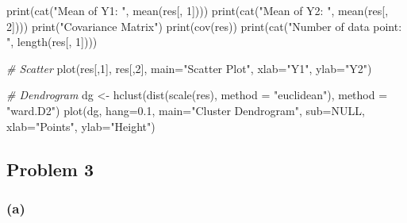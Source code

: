 \documentclass[
]{article}
\newenvironment{Shaded}{\begin{snugshade}}{\end{snugshade}}
\newcommand{\AttributeTok}[1]{\textcolor[rgb]{0.77,0.63,0.00}{#1}}
\newcommand{\CommentTok}[1]{\textcolor[rgb]{0.56,0.35,0.01}{\textit{#1}}}
\newcommand{\ConstantTok}[1]{\textcolor[rgb]{0.00,0.00,0.00}{#1}}
\newcommand{\DecValTok}[1]{\textcolor[rgb]{0.00,0.00,0.81}{#1}}
\newcommand{\FloatTok}[1]{\textcolor[rgb]{0.00,0.00,0.81}{#1}}
\newcommand{\FunctionTok}[1]{\textcolor[rgb]{0.00,0.00,0.00}{#1}}
\newcommand{\NormalTok}[1]{#1}
\newcommand{\OtherTok}[1]{\textcolor[rgb]{0.56,0.35,0.01}{#1}}
\newcommand{\StringTok}[1]{\textcolor[rgb]{0.31,0.60,0.02}{#1}}
\begin{document}
\begin{Shaded}
\begin{Highlighting}[]
\FunctionTok{print}\NormalTok{(}\FunctionTok{cat}\NormalTok{(}\StringTok{"Mean of Y1: "}\NormalTok{, }\FunctionTok{mean}\NormalTok{(res[, }\DecValTok{1}\NormalTok{])))}
\FunctionTok{print}\NormalTok{(}\FunctionTok{cat}\NormalTok{(}\StringTok{"Mean of Y2: "}\NormalTok{, }\FunctionTok{mean}\NormalTok{(res[, }\DecValTok{2}\NormalTok{])))}
\FunctionTok{print}\NormalTok{(}\StringTok{"Covariance Matrix"}\NormalTok{)}
\FunctionTok{print}\NormalTok{(}\FunctionTok{cov}\NormalTok{(res))}
\FunctionTok{print}\NormalTok{(}\FunctionTok{cat}\NormalTok{(}\StringTok{"Number of data point: "}\NormalTok{, }\FunctionTok{length}\NormalTok{(res[, }\DecValTok{1}\NormalTok{])))}

\CommentTok{\# Scatter}
\FunctionTok{plot}\NormalTok{(res[,}\DecValTok{1}\NormalTok{], res[,}\DecValTok{2}\NormalTok{], }\AttributeTok{main=}\StringTok{"Scatter Plot"}\NormalTok{, }\AttributeTok{xlab=}\StringTok{"Y1"}\NormalTok{, }\AttributeTok{ylab=}\StringTok{"Y2"}\NormalTok{)}

\CommentTok{\# Dendrogram}
\NormalTok{dg }\OtherTok{\textless{}{-}} \FunctionTok{hclust}\NormalTok{(}\FunctionTok{dist}\NormalTok{(}\FunctionTok{scale}\NormalTok{(res), }\AttributeTok{method =} \StringTok{"euclidean"}\NormalTok{), }\AttributeTok{method =} \StringTok{"ward.D2"}\NormalTok{)}
\FunctionTok{plot}\NormalTok{(dg, }\AttributeTok{hang=}\FloatTok{0.1}\NormalTok{, }\AttributeTok{main=}\StringTok{"Cluster Dendrogram"}\NormalTok{, }\AttributeTok{sub=}\ConstantTok{NULL}\NormalTok{, }\AttributeTok{xlab=}\StringTok{"Points"}\NormalTok{, }\AttributeTok{ylab=}\StringTok{"Height"}\NormalTok{)}
\end{Highlighting}
\end{Shaded}

\hypertarget{problem-3-1}{%
\subsection{Problem 3}\label{problem-3-1}}

\hypertarget{a}{%
\subsubsection{(a)}\label{a}}
\end{document}
